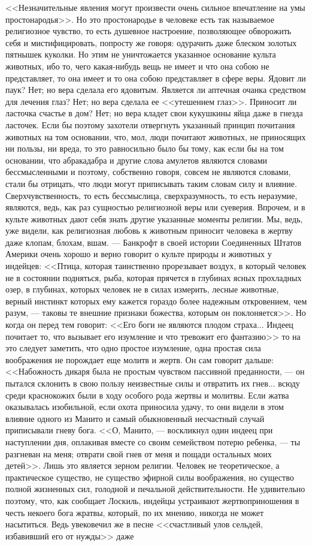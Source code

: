 \documentclass[12pt]{article}
\begin{document}
<<Незначительные явления могут произвести очень сильное впечатление на умы простонародья>>. Но это простонародье в человеке есть так называемое религиозное чувство, то есть душевное настроение, позволяющее обворожить себя и мистифицировать, попросту же говоря: одурачить даже блеском золотых пятнышек куколки. Но этим не уничтожается указанное основание культа животных, ибо то, чего какая-нибудь вещь не имеет и что она собою не представляет, то она имеет и то она собою представляет в сфере веры. Ядовит ли паук? Нет; но вера сделала его ядовитым. Является ли аптечная очанка средством для лечения глаз? Нет; но вера сделала ее <<утешением глаз>>. Приносит ли ласточка счастье в дом? Нет; но вера кладет свои кукушкины яйца даже в гнезда ласточек. Если бы поэтому захотели отвергнуть указанный принцип почитания животных на том основании, что, мол, люди почитают животных, не приносящих ни пользы, ни вреда, то это равносильно было бы тому, как если бы на том основании, что абракадабра и другие слова амулетов являются словами бессмысленными и поэтому, собственно говоря, совсем не являются словами, стали бы отрицать, что люди могут приписывать таким словам силу и влияние. Сверхчувственность, то есть бессмыслица, сверхразумность, то есть неразумие, являются, ведь, как раз сущностью религиозной веры или суеверия. Впрочем, и в культе животных дают себя знать другие указанные моменты религии. Мы, ведь, уже видели, как религиозная любовь к животным приносит человека в жертву даже клопам, блохам, вшам. --- Банкрофт в своей истории Соединенных Штатов Америки очень хорошо и верно говорит о культе природы и животных у индейцев: <<Птица, которая таинственно прорезывает воздух, в который человек не в состоянии подняться, рыба, которая прячется в глубинах ясных прохладных озер, в глубинах, которых человек не в силах измерить, лесные животные, верный инстинкт которых ему кажется гораздо более надежным откровением, чем разум, --- таковы те внешние признаки божества, которым он поклоняется>>. Но когда он перед тем говорит: <<Его боги не являются плодом страха... Индеец почитает то, что вызывает его изумление и что тревожит его фантазию>>  то на это следует заметить, что одно простое изумление, одна простая сила воображения не порождает еще молитв и жертв. Он сам говорит дальше: <<Набожность дикаря была не простым чувством пассивной преданности, --- он пытался склонить в свою пользу неизвестные силы и отвратить их гнев... всюду среди краснокожих были в ходу особого рода жертвы и молитвы. Если жатва оказывалась изобильной, если охота приносила удачу, то они видели в этом влияние одного из Манито и самый обыкновенный несчастный случай приписывали гневу бога. <<О, Манито, --- воскликнул один индеец при наступлении дня, оплакивая вместе со своим семейством потерю ребенка, --- ты разгневан на меня; отврати свой гнев от меня и пощади остальных моих детей>>. Лишь это является зерном религии. Человек не теоретическое, а практическое существо, не существо эфирной силы воображения, но существо полной жизненных сил, голодной и печальной действительности. Не удивительно поэтому, что, как сообщает Лоскиль, индейцы устраивают жертвоприношения в честь некоего бога жратвы, который, по их мнению, никогда не может насытиться. Ведь увековечил же в песне <<счастливый улов сельдей, избавивший его от нужды>> даже 
\end{document}
